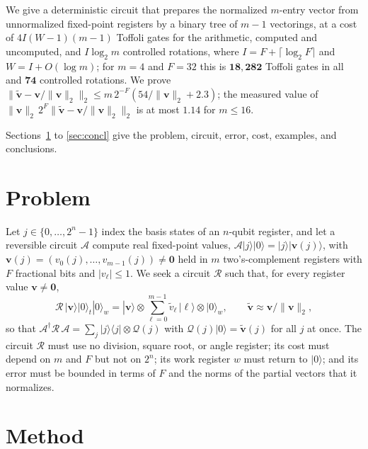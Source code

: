 \documentclass[9pt,twocolumn]{extarticle}
\newcommand{\norm}[1]{\lVert #1\rVert}
\begin{document}
We give a deterministic circuit that prepares the normalized $m$-entry vector
from unnormalized fixed-point registers by a binary tree of $m - 1$ vectorings,
at a cost of $4I(W - 1)(m - 1)$ Toffoli gates for the arithmetic, computed and
uncomputed, and $I\log_2 m$ controlled rotations, where $I = F + \lceil\log_2
F\rceil$ and $W = I + O(\log m)$; for $m = 4$ and $F = 32$ this is
$\bm{18{,}282}$ Toffoli gates in all and $\bm{74}$ controlled rotations. We
prove $\norm{\tilde{\bm v} - \bm v/\norm{\bm v}_2}_2 \le m\,2^{-F}(54/\norm{\bm
v}_2 + 2.3)$; the measured value of $\norm{\bm v}_2\,2^F\norm{\tilde{\bm v} -
\bm v/\norm{\bm v}_2}_2$ is at most $\bm{1.14}$ for $m \le 16$.

Sections~\ref{sec:problem} to \ref{sec:concl} give the problem, circuit,
error, cost, examples, and conclusions.

\section{Problem}\label{sec:problem}

Let $j \in \{0, \dots, 2^n - 1\}$ index the basis states of an $n$-qubit
register, and let a reversible circuit $\mathcal A$ compute real fixed-point
values, $\mathcal A|j\rangle|0\rangle = |j\rangle|\bm v(j)\rangle$, with
$\bm v(j) = (v_0(j), \dots, v_{m-1}(j)) \ne \bm 0$ held in $m$ two's-complement
registers with $F$ fractional bits and $|v_\ell| \le 1$. We seek a circuit
$\mathcal R$ such that, for every register value $\bm v \ne \bm 0$,
\begin{equation}
\mathcal R\,|\bm v\rangle|0\rangle_t|0\rangle_w
= |\bm v\rangle \otimes \sum_{\ell=0}^{m-1} \tilde v_\ell\,|\ell\rangle \otimes |0\rangle_w ,
\qquad \tilde{\bm v} \approx \bm v / \norm{\bm v}_2 ,
\label{eq:problem}
\end{equation}
so that $\mathcal A^{\dagger}\mathcal R\,\mathcal A
= \sum_j |j\rangle\langle j| \otimes \mathcal Q(j)$ with
$\mathcal Q(j)|0\rangle = \tilde{\bm v}(j)$ for all $j$ at once. The circuit
$\mathcal R$ must use no division, square root, or angle register; its cost must
depend on $m$ and $F$ but not on $2^n$; its work register $w$ must return to
$|0\rangle$; and its error must be bounded in terms of $F$ and the norms of the
partial vectors that it normalizes.

\section{Method}\label{sec:method}
\end{document}

